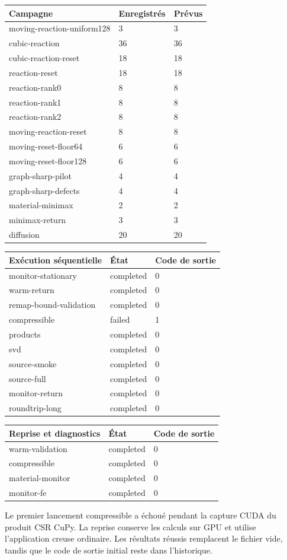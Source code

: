 \documentclass[10pt,a4paper]{article}
\begin{document}
\begin{center}\small\begin{tabular}{lll}\toprule
Campagne & Enregistrés & Prévus\\\midrule
moving-reaction-uniform128 & 3 & 3\\
cubic-reaction & 36 & 36\\
cubic-reaction-reset & 18 & 18\\
reaction-reset & 18 & 18\\
reaction-rank0 & 8 & 8\\
reaction-rank1 & 8 & 8\\
reaction-rank2 & 8 & 8\\
moving-reaction-reset & 8 & 8\\
moving-reset-floor64 & 6 & 6\\
moving-reset-floor128 & 6 & 6\\
graph-sharp-pilot & 4 & 4\\
graph-sharp-defects & 4 & 4\\
material-minimax & 2 & 2\\
minimax-return & 3 & 3\\
diffusion & 20 & 20\\
\bottomrule\end{tabular}\end{center}
\begin{center}\small\begin{tabular}{lll}\toprule
Exécution séquentielle & État & Code de sortie\\\midrule
monitor-stationary & completed & 0\\
warm-return & completed & 0\\
remap-bound-validation & completed & 0\\
compressible & failed & 1\\
products & completed & 0\\
svd & completed & 0\\
source-smoke & completed & 0\\
source-full & completed & 0\\
monitor-return & completed & 0\\
roundtrip-long & completed & 0\\
\bottomrule\end{tabular}\end{center}
\begin{center}\small\begin{tabular}{lll}\toprule
Reprise et diagnostics & État & Code de sortie\\\midrule
warm-validation & completed & 0\\
compressible & completed & 0\\
material-monitor & completed & 0\\
monitor-fe & completed & 0\\
\bottomrule\end{tabular}\end{center}
Le premier lancement compressible a échoué pendant la capture CUDA du produit CSR CuPy. La reprise conserve les calculs sur GPU et utilise l'application creuse ordinaire. Les résultats réussis remplacent le fichier vide, tandis que le code de sortie initial reste dans l'historique.
\end{document}
